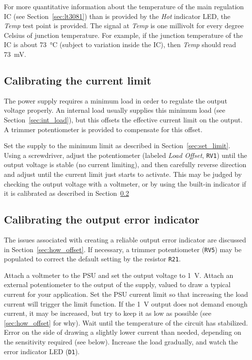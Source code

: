 \documentclass[letterpaper,twocolumn,11pt]{article}
\newcommand{\refdes}[1]{\texttt{#1}}
\begin{document}
For more quantitative information about the temperature of the main regulation
IC (see Section~\ref{sec:lt3081}) than is provided by the \textit{Hot} indicator
LED, the \textit{Temp} test point is provided. The signal at \textit{Temp} is
one millivolt for every degree Celsius of junction temperature. For example, if
the junction temperature of the IC is about \SI{73}{\celsius} (subject to
variation inside the IC), then \textit{Temp} should read \SI{73}{\mV}.

\subsection{Calibrating the current limit}

The power supply requires a minimum load in order to regulate the output voltage
properly. An internal load usually supplies this minimum load (see
Section~\ref{sec:int_load}), but this offsets the effective current limit on the
output. A trimmer potentiometer is provided to compensate for this offset.

Set the supply to the minimum limit as described in Section~\ref{sec:set_limit}.
Using a screwdriver, adjust the potentiometer (labeled \emph{Load
Offset}, \refdes{RV1}) until the output voltage is stable (no current limiting),
and then carefully reverse direction and adjust until the current limit just
starts to activate. This may be judged by checking the output voltage with a
voltmeter, or by using the built-in indicator if it is calibrated as described
in Section~\ref{sec:cal_offset}

\subsection{Calibrating the output error indicator}\label{sec:cal_offset}

The issues associated with creating a reliable output error indicator are
discussed in Section~\ref{sec:how_offset}. If necessary, a trimmer potentiometer
(\refdes{RV5}) may be populated to correct the default setting by the resistor
\refdes{R21}.

Attach a voltmeter to the PSU and set the output voltage to \SI{1}{\V}. Attach
an external potentiometer to the output of the supply, valued to draw a typical
current for your application. Set the PSU current limit so that increasing the
load current will trigger the limit function. If the \SI{1}{\V} output does not
demand enough current, it may be increased, but try to keep it as low as
possible (see \ref{sec:how_offset} for why). Wait until the temperature of the
circuit has stabilized. Error on the side of drawing a slightly lower current
than needed, depending on the sensitivity required (see below). Increase the
load gradually, and watch the error indicator LED (\refdes{D1}).
\end{document}

